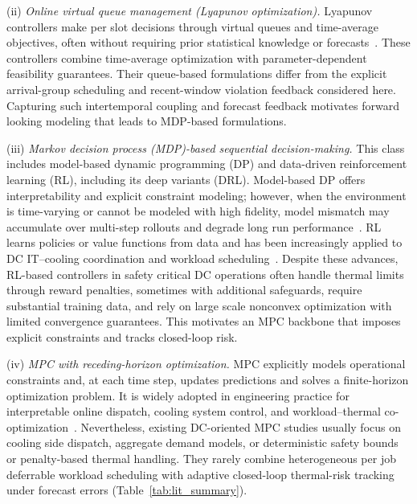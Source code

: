 \documentclass[a4paper,fleqn]{cas-dc}
\theoremstyle{plain}
\theoremstyle{remark}
\theoremstyle{plain}
\begin{document}
(ii) \textit{Online virtual queue management (Lyapunov optimization).}
Lyapunov controllers make per slot decisions through virtual queues and time-average objectives, often without requiring prior statistical knowledge or forecasts~\cite{xie2025_low_carbon_workload_thermal,gao2024_online_electricity_dvb}. These controllers combine time-average optimization with parameter-dependent feasibility guarantees. Their queue-based formulations differ from the explicit arrival-group scheduling and recent-window violation feedback considered here. Capturing such intertemporal coupling and forecast feedback motivates forward looking modeling that leads to MDP-based formulations.

(iii) \textit{Markov decision process (MDP)-based sequential decision-making.} This class includes model-based dynamic programming (DP) and data-driven reinforcement learning (RL), including its deep variants (DRL). Model-based DP offers interpretability and explicit constraint modeling; however, when the environment is time-varying or cannot be modeled with high fidelity, model mismatch may accumulate over multi-step rollouts and degrade long run performance~\cite{chakraborty2025_renewable_overbooking,chitsaz2024_ctmdp_power_mgmt}. RL learns policies or value functions from data and has been increasingly applied to DC IT--cooling coordination and workload scheduling~\cite{zhao2025_rl_holistic_energy,ran2026_d3t_dual_timescale,ding2025_job_scheduling_uncertain}. Despite these advances, RL-based controllers in safety critical DC operations often handle thermal limits through reward penalties, sometimes with additional safeguards, require substantial training data, and rely on large scale nonconvex optimization with limited convergence guarantees. This motivates an MPC backbone that imposes explicit constraints and tracks closed-loop risk.

(iv) \textit{MPC with receding-horizon optimization.}
MPC explicitly models operational constraints and, at each time step, updates predictions and solves a finite-horizon optimization problem. It is widely adopted in engineering practice for interpretable online dispatch, cooling system control, and workload--thermal co-optimization~\cite{guo2024_multitimescale_mpc_interconnected_dcs,zhu2022_smpc_dcmg_dispatch,wang2025_mpc_cooling_workload_rack_dc,li2024_robust_mpc_thermal_rack,li2023_subspace_mpc_air_cooled}. Nevertheless, existing DC-oriented MPC studies usually focus on cooling side dispatch, aggregate demand models, or deterministic safety bounds or penalty-based thermal handling. They rarely combine heterogeneous per job deferrable workload scheduling with adaptive closed-loop thermal-risk tracking under forecast errors (Table~\ref{tab:lit_summary}).
\end{document}
